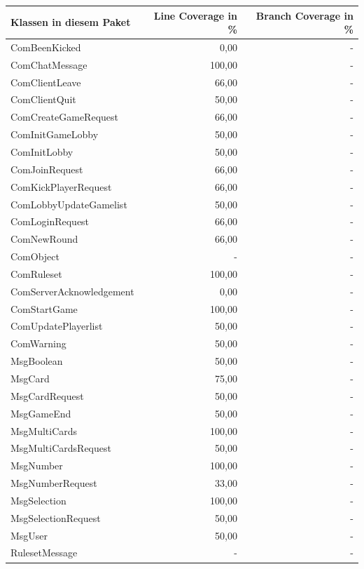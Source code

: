 \documentclass[a4paper]{article}
\begin{document}
\begin{tabular}{|l|r|r|}
\hline
Klassen in diesem Paket & Line Coverage in \% & Branch Coverage in \% \\ \hline \hline
ComBeenKicked & 0,00 & - \\ \hline
ComChatMessage & 100,00 & - \\ \hline
ComClientLeave & 66,00 & - \\ \hline
ComClientQuit & 50,00& - \\ \hline
ComCreateGameRequest & 66,00 &  -\\ \hline
ComInitGameLobby & 50,00 & - \\ \hline
ComInitLobby & 50,00 & - \\ \hline
ComJoinRequest & 66,00 &  -\\ \hline
ComKickPlayerRequest & 66,00 & - \\ \hline
ComLobbyUpdateGamelist & 50,00 &  -\\ \hline
ComLoginRequest & 66,00 & - \\ \hline
ComNewRound & 66,00 &  -\\ \hline
ComObject &- &-  \\ \hline
ComRuleset & 100,00 &  -\\ \hline
ComServerAcknowledgement & 0,00 & - \\ \hline
ComStartGame & 100,00 &-  \\ \hline
ComUpdatePlayerlist & 50,00 &  -\\ \hline
ComWarning & 50,00 &  -\\ \hline
MsgBoolean & 50,00 &- \\ \hline
MsgCard & 75,00 & - \\ \hline
MsgCardRequest & 50,00 &- \\ \hline
MsgGameEnd & 50,00 & - \\ \hline
MsgMultiCards & 100,00 & - \\ \hline
MsgMultiCardsRequest & 50,00 &-  \\ \hline
MsgNumber & 100,00 & - \\ \hline
MsgNumberRequest & 33,00 &  -\\ \hline
MsgSelection & 100,00 &-  \\ \hline
MsgSelectionRequest & 50,00 &  -\\ \hline
MsgUser & 50,00 &  -\\ \hline
RulesetMessage & -& -\\ \hline
\end{tabular}
\end{document}

